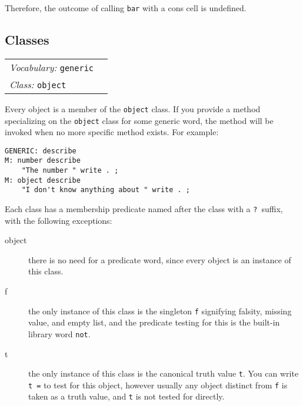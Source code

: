 \documentclass{book}
\newcommand{\vocabulary}[1]{\emph{Vocabulary:} \texttt{#1}&\\}
\newcommand{\classword}[1]{\index{\texttt{#1}}\emph{Class:} \texttt{#1}&\\}
\newcommand{\wordtable}[1]{

\begin{tabularx}{12cm}[t]{lX}
\hline
#1
\hline
\end{tabularx}

}
\begin{document}
Therefore, the outcome of calling \texttt{bar} with a cons cell is undefined.

\subsection{Classes}

\wordtable{
\vocabulary{generic}
\classword{object}
}
Every object is a member of the \texttt{object} class. If you provide a method specializing
on the \texttt{object} class for some generic word, the method will be
invoked when no more specific method exists. For example:
\begin{verbatim}
GENERIC: describe
M: number describe
    "The number " write . ;
M: object describe
    "I don't know anything about " write . ;
\end{verbatim}
Each class has a membership predicate named
after the class with a \texttt{?}~suffix, with the following exceptions:
\begin{description}
\item[object] there is no need for a predicate word, since
every object is an instance of this class.
\item[f] the only instance of this class is the singleton
\texttt{f} signifying falsity, missing value, and empty list, and the predicate testing for this is the built-in library word \texttt{not}.
\item[t] the only instance of this class is the canonical truth value
\texttt{t}. You can write \texttt{t =} to test for this object, however usually
any object distinct from \texttt{f} is taken as a truth value, and \texttt{t} is not tested for directly.
\end{description}
\end{document}

